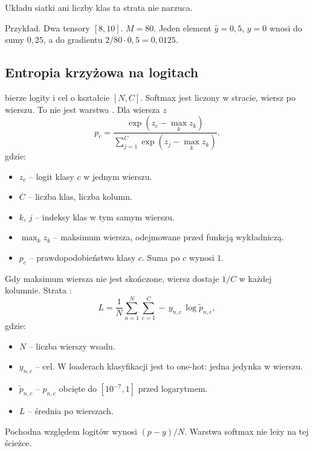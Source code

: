Układu siatki ani liczby klas ta strata nie narzuca.

Przykład. Dwa tensory \([8, 10]\). \(M = 80\). Jeden element \(\hat{y} = 0{,}5\), \(y = 0\) wnosi do sumy \(0{,}25\), a do gradientu \(2/80 \cdot 0{,}5 = 0{,}0125\).

\subsection{Entropia krzyżowa na logitach}

 bierze logity i cel o kształcie \([N, C]\). Softmax jest liczony w stracie, wiersz po wierszu. To nie jest warstwa . Dla wiersza \(z\)
\begin{equation}
\label{eq:softmax}
p_c = \frac{\exp(z_c - \max_k z_k)}{\sum_{j=1}^{C}\exp(z_j - \max_k z_k)}.
\end{equation}
gdzie:
\begin{itemize}
\item \(z_c\) -- logit klasy \(c\) w jednym wierszu.
\item \(C\) -- liczba klas, liczba kolumn.
\item \(k\), \(j\) -- indeksy klas w tym samym wierszu.
\item \(\max_k z_k\) -- maksimum wiersza, odejmowane przed funkcją wykładniczą.
\item \(p_c\) -- prawdopodobieństwo klasy \(c\). Suma po \(c\) wynosi \(1\).
\end{itemize}

Gdy maksimum wiersza nie jest skończone, wiersz dostaje \(1/C\) w każdej kolumnie. Strata \cite{goodfellow2016deep}:
\begin{equation}
\label{eq:ce}
L = \frac{1}{N}\sum_{n=1}^{N}\sum_{c=1}^{C}
  -\, y_{n,c}\,\log \tilde{p}_{n,c},
\end{equation}
gdzie:
\begin{itemize}
\item \(N\) -- liczba wierszy wsadu.
\item \(y_{n,c}\) -- cel. W loaderach klasyfikacji jest to one-hot: jedna jedynka w wierszu.
\item \(\tilde{p}_{n,c}\) -- \(p_{n,c}\) obcięte do \([10^{-7}, 1]\) przed logarytmem.
\item \(L\) -- średnia po wierszach.
\end{itemize}

Pochodna względem logitów wynosi \((p - y) / N\). Warstwa softmax nie leży na tej ścieżce.

